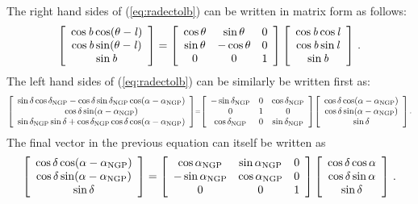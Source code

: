 The right hand sides of (\ref{eq:radectolb}) can be written in matrix
form as follows:
\begin{equation}\label{eq:radectolbmatrix1}
\left[ \begin{array}{c} \cos {\it b} \cos (\theta - {\it l}) \\ \cos {\it b} \sin(\theta-{\it l})\\ \sin {\it b} \end{array} \right]  = 
\left[ \begin{array}{ccc} \cos \theta & \sin \theta & 0\\\sin \theta & -\cos \theta & 0\\0&0&1 \end{array} \right]
\left[ \begin{array}{c} \cos {\it b} \cos {\it l} \\ \cos {\it b} \sin {\it l} \\ \sin {\it b} \end{array} \right]\, .
\end{equation}
The left hand sides of (\ref{eq:radectolb}) can be similarly be written first as:
\begin{equation}\scriptstyle\label{eq:radectolbmatrix2}
\left[ \begin{array}{c} \sin\delta \cos\delta_{\textnormal{NGP}} - \cos\delta \sin\delta_{\textnormal{NGP}} \cos(\alpha-\alpha_{\textnormal{NGP}})\\ 
\cos \delta \sin (\alpha-\alpha_{\textnormal{NGP}})\\
\sin \delta_{\textnormal{NGP}} \sin \delta + \cos\delta_{\textnormal{NGP}} \cos\delta \cos(\alpha-\alpha_{\textnormal{NGP}}) \end{array} \right] = 
\left[ \begin{array}{ccc} -\sin \delta_{\textnormal{NGP}} & 0 & \cos \delta_{\textnormal{NGP}}\\ 0 & 1 & 0 \\ \cos \delta_{\textnormal{NGP}} & 0 & \sin \delta_{\textnormal{NGP}}\end{array} \right] 
\left[ \begin{array}{c} \cos \delta \cos(\alpha - \alpha_{\textnormal{NGP}})\\\cos \delta \sin(\alpha-\alpha_{\textnormal{NGP}})\\\sin\delta \end{array} \right]\, .
\end{equation}
The final vector in the previous equation can itself be written as
\begin{equation}\label{eq:radectolbmatrix3}
\left[ \begin{array}{c} \cos \delta \cos(\alpha - \alpha_{\textnormal{NGP}})\\\cos \delta \sin(\alpha-\alpha_{\textnormal{NGP}})\\\sin\delta \end{array} \right] = 
\left[ \begin{array}{ccc} \cos \alpha_{\textnormal{NGP}} &\sin\alpha_{\textnormal{NGP}}&0\\ -\sin\alpha_{\textnormal{NGP}} & \cos\alpha_{\textnormal{NGP}}&0\\ 0&0&1\end{array} \right]
\left[ \begin{array}{c} \cos \delta \cos \alpha \\ \cos \delta \sin \alpha \\ \sin \delta \end{array} \right]\, .
\end{equation}
